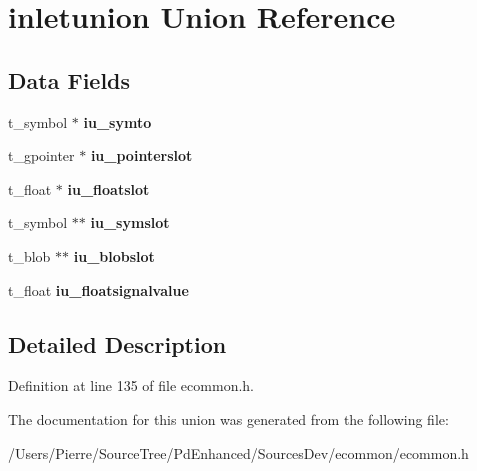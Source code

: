 \hypertarget{unioninletunion}{\section{inletunion Union Reference}
\label{unioninletunion}
}
\subsection*{Data Fields}
\begin{DoxyCompactItemize}
\item 
\hypertarget{unioninletunion_a034ef76c9ac47aad410c151b1a3072ed}{t\-\_\-symbol $\ast$ {\bfseries iu\-\_\-symto}}\label{unioninletunion_a034ef76c9ac47aad410c151b1a3072ed}

\item 
\hypertarget{unioninletunion_a765f6acce4359fbeaebd130279fdd899}{t\-\_\-gpointer $\ast$ {\bfseries iu\-\_\-pointerslot}}\label{unioninletunion_a765f6acce4359fbeaebd130279fdd899}

\item 
\hypertarget{unioninletunion_a4ea31644c26b1c46f9541353b293d3f6}{t\-\_\-float $\ast$ {\bfseries iu\-\_\-floatslot}}\label{unioninletunion_a4ea31644c26b1c46f9541353b293d3f6}

\item 
\hypertarget{unioninletunion_a347eb160d2e6d55719beabdae51a2ac9}{t\-\_\-symbol $\ast$$\ast$ {\bfseries iu\-\_\-symslot}}\label{unioninletunion_a347eb160d2e6d55719beabdae51a2ac9}

\item 
\hypertarget{unioninletunion_aa5bed621c07aa6838a05e81384933715}{t\-\_\-blob $\ast$$\ast$ {\bfseries iu\-\_\-blobslot}}\label{unioninletunion_aa5bed621c07aa6838a05e81384933715}

\item 
\hypertarget{unioninletunion_a4b62c62214438358765fee52d88ac7c5}{t\-\_\-float {\bfseries iu\-\_\-floatsignalvalue}}\label{unioninletunion_a4b62c62214438358765fee52d88ac7c5}

\end{DoxyCompactItemize}


\subsection{Detailed Description}


Definition at line 135 of file ecommon.\-h.



The documentation for this union was generated from the following file\-:\begin{DoxyCompactItemize}
\item 
/\-Users/\-Pierre/\-Source\-Tree/\-Pd\-Enhanced/\-Sources\-Dev/ecommon/ecommon.\-h\end{DoxyCompactItemize}
